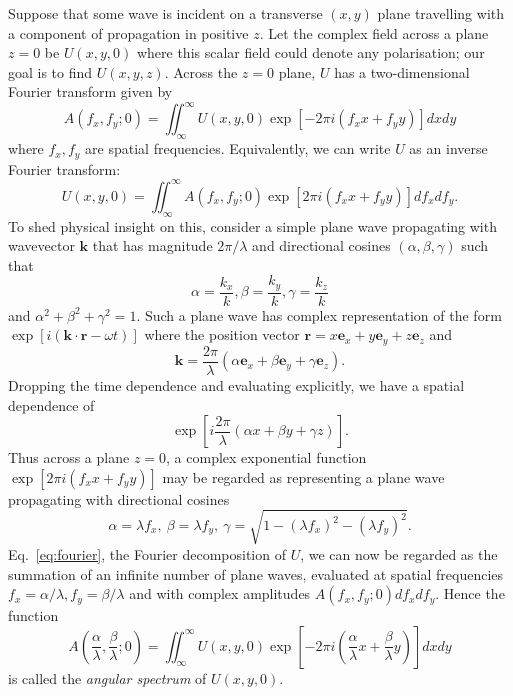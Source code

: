 \documentclass[12pt,a4paper]{article}
\begin{document}
Suppose that some wave is incident on a transverse \((x,y)\) plane travelling with a component of propagation in positive \(z\). Let the complex field across a plane \(z=0\) be \(U(x,y,0)\) where this scalar field could denote any polarisation; our goal is to find \(U(x,y,z)\). Across the \(z=0\) plane, \(U\) has a two-dimensional Fourier transform given by
\begin{displaymath}
	A\!\left(f_{x},f_{y};0\right)=\iint_{\infty}^{\infty}U\!\left(x,y,0\right)\exp\left[-2\pi i\left(f_{x}x+f_{y}y\right)\right]dxdy
\end{displaymath}
where \(f_{x},f_{y}\) are spatial frequencies. Equivalently, we can write \(U\) as an inverse Fourier transform:
\begin{equation}
	\label{eq:fourier}
	U\!\left(x,y,0\right)=\iint_{\infty}^{\infty}A\!\left(f_{x},f_{y};0\right)\exp\left[2\pi i\left(f_{x}x+f_{y}y\right)\right]df_{x}df_{y}.
\end{equation}
To shed physical insight on this, consider a simple plane wave propagating with wavevector \(\mathbf{k}\) that has magnitude \(2\pi/\lambda\) and directional cosines \(\left(\alpha,\beta,\gamma\right)\) such that 
\begin{displaymath}
	\alpha=\frac{k_{x}}{k}, \beta=\frac{k_{y}}{k}, \gamma=\frac{k_{z}}{k}
\end{displaymath}
and \(\alpha^{2}+\beta^{2}+\gamma^{2}=1\). Such a plane wave has complex representation of the form \(\exp\!\left[i\left(\mathbf{k}\cdot\mathbf{r}-\omega t\right)\right]\) where the position vector \(\mathbf{r}=x\mathbf{e}_{x}+y\mathbf{e}_{y}+z\mathbf{e}_{z}\) and 
\begin{displaymath}
	\mathbf{k}=\frac{2\pi}{\lambda}\left(\alpha \mathbf{e}_{x}+\beta \mathbf{e}_{y}+\gamma \mathbf{e}_{z}\right).
\end{displaymath}
Dropping the time dependence and evaluating explicitly, we have a spatial dependence of
\begin{displaymath}
	\exp\left[i\frac{2\pi}{\lambda}\left(\alpha x+\beta y+\gamma z\right)\right].
\end{displaymath}
Thus across a plane \(z=0\), a complex exponential function \(\exp\left[2\pi i\left(f_{x}x+f_{y}y\right)\right]\)	may be regarded as representing a plane wave propagating with directional cosines
\begin{displaymath}
	\alpha=\lambda f_{x},\:\beta=\lambda f_{y},\:\gamma=\sqrt{1-\left(\lambda f_{x}\right)^{2}-\left(\lambda f_{y}\right)^{2}}.
\end{displaymath}
Eq.~\eqref{eq:fourier}, the Fourier decomposition of \(U\), we can now be regarded as the summation of an infinite number of plane waves, evaluated at spatial frequencies \(f_{x}=\alpha/\lambda, f_{y}=\beta/\lambda\) and with complex amplitudes \(A\left(f_{x},f_{y};0\right)df_{x}df_{y}\). Hence the function
\begin{equation}
	\label{eq:angspec}
	A\!\left(\frac{\alpha}{\lambda},\frac{\beta}{\lambda};0\right)=\iint_{\infty}^{\infty}U\!\left(x,y,0\right)\exp\left[-2\pi i\left(\frac{\alpha}{\lambda}x+\frac{\beta}{\lambda}y\right)\right]dxdy
\end{equation}
is called the \emph{angular spectrum} of \(U(x,y,0)\).
\end{document}
